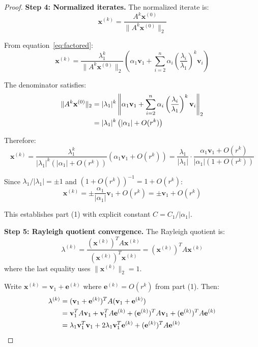 \documentclass[11pt,a4paper]{article}
\begin{document}
\begin{proof}
\textbf{Step 4: Normalized iterates.}
The normalized iterate is:
\begin{equation}
\mathbf{x}^{(k)} = \frac{A^k \mathbf{x}^{(0)}}{\|A^k \mathbf{x}^{(0)}\|_2}
\end{equation}

From equation~\eqref{eq:factored}:
\begin{equation}
\mathbf{x}^{(k)} = \frac{\lambda_1^k}{\|A^k \mathbf{x}^{(0)}\|_2} \left(\alpha_1 \mathbf{v}_1 + \sum_{i=2}^n \alpha_i \left(\frac{\lambda_i}{\lambda_1}\right)^k \mathbf{v}_i\right)
\end{equation}

The denominator satisfies:
\begin{align}
\|A^k \mathbf{x}^{(0)}\|_2 &= |\lambda_1|^k \left\|\alpha_1 \mathbf{v}_1 + \sum_{i=2}^n \alpha_i \left(\frac{\lambda_i}{\lambda_1}\right)^k \mathbf{v}_i\right\|_2 \notag\\
&= |\lambda_1|^k \left(|\alpha_1| + O(r^k)\right) \label{eq:denom}
\end{align}

Therefore:
\begin{equation}
\mathbf{x}^{(k)} = \frac{\lambda_1^k}{|\lambda_1|^k(|\alpha_1| + O(r^k))} \left(\alpha_1 \mathbf{v}_1 + O(r^k)\right) = \frac{\lambda_1}{|\lambda_1|} \cdot \frac{\alpha_1 \mathbf{v}_1 + O(r^k)}{|\alpha_1|(1 + O(r^k))}
\end{equation}

Since $\lambda_1/|\lambda_1| = \pm 1$ and $(1 + O(r^k))^{-1} = 1 + O(r^k)$:
\begin{equation}
\mathbf{x}^{(k)} = \pm \frac{\alpha_1}{|\alpha_1|} \mathbf{v}_1 + O(r^k) = \pm \mathbf{v}_1 + O(r^k)
\end{equation}

This establishes part (1) with explicit constant $C = C_1/|\alpha_1|$.

\textbf{Step 5: Rayleigh quotient convergence.}
The Rayleigh quotient is:
\begin{equation}
\lambda^{(k)} = \frac{(\mathbf{x}^{(k)})^T A \mathbf{x}^{(k)}}{(\mathbf{x}^{(k)})^T \mathbf{x}^{(k)}} = (\mathbf{x}^{(k)})^T A \mathbf{x}^{(k)}
\end{equation}
where the last equality uses $\|\mathbf{x}^{(k)}\|_2 = 1$.

Write $\mathbf{x}^{(k)} = \mathbf{v}_1 + \mathbf{e}^{(k)}$ where $\mathbf{e}^{(k)} = O(r^k)$ from part (1). Then:
\begin{align}
\lambda^{(k)} &= (\mathbf{v}_1 + \mathbf{e}^{(k)})^T A (\mathbf{v}_1 + \mathbf{e}^{(k)}) \notag\\
&= \mathbf{v}_1^T A \mathbf{v}_1 + \mathbf{v}_1^T A \mathbf{e}^{(k)} + (\mathbf{e}^{(k)})^T A \mathbf{v}_1 + (\mathbf{e}^{(k)})^T A \mathbf{e}^{(k)} \notag\\
&= \lambda_1 \mathbf{v}_1^T \mathbf{v}_1 + 2\lambda_1 \mathbf{v}_1^T \mathbf{e}^{(k)} + (\mathbf{e}^{(k)})^T A \mathbf{e}^{(k)} \label{eq:rayleigh_expand}
\end{align}


\end{proof}
\end{document}
